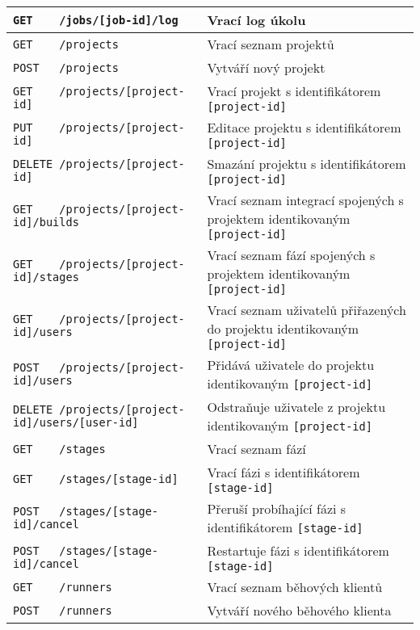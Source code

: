 \begin{sidewaystable}[h]
\begin{tabular}{|l|l|}
\verb|GET    /jobs/[job-id]/log|                         & Vrací log úkolu \\ \hline
\verb|GET    /projects|                                  & Vrací seznam projektů \\ \hline
\verb|POST   /projects|                                  & Vytváří nový projekt \\ \hline
\verb|GET    /projects/[project-id]|                     & Vrací projekt s identifikátorem \verb|[project-id]| \\ \hline
\verb|PUT    /projects/[project-id]|                     & Editace projektu s identifikátorem \verb|[project-id]| \\ \hline
\verb|DELETE /projects/[project-id]|                     & Smazání projektu s identifikátorem \verb|[project-id]| \\ \hline
\verb|GET    /projects/[project-id]/builds|              & Vrací seznam integrací spojených s projektem identikovaným \verb|[project-id]| \\ \hline
\verb|GET    /projects/[project-id]/stages|              & Vrací seznam fází spojených s projektem identikovaným \verb|[project-id]| \\ \hline
\verb|GET    /projects/[project-id]/users|               & Vrací seznam uživatelů přiřazených do projektu identikovaným \verb|[project-id]| \\ \hline
\verb|POST   /projects/[project-id]/users|               & Přidává uživatele do projektu identikovaným \verb|[project-id]| \\ \hline
\verb|DELETE /projects/[project-id]/users/[user-id]|     & Odstraňuje uživatele z projektu identikovaným \verb|[project-id]| \\ \hline
\verb|GET    /stages|                                    & Vrací seznam fází \\ \hline
\verb|GET    /stages/[stage-id]|                         & Vrací fázi s identifikátorem \verb|[stage-id]| \\ \hline
\verb|POST   /stages/[stage-id]/cancel|                  & Přeruší probíhající fázi s identifikátorem \verb|[stage-id]| \\ \hline
\verb|POST   /stages/[stage-id]/cancel|                  & Restartuje fázi s identifikátorem \verb|[stage-id]| \\ \hline
\verb|GET    /runners|                                   & Vrací seznam běhových klientů \\ \hline
\verb|POST   /runners|                                   & Vytváří nového běhového klienta \\ \hline

\end{tabular}
\end{sidewaystable}
